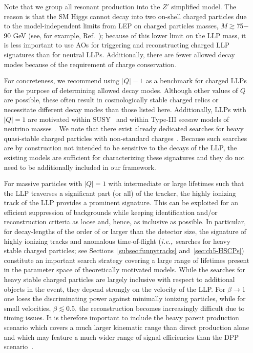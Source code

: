 Note that we group all resonant production into the $Z'$ simplified model.
The reason is that the SM Higgs cannot decay into two on-shell charged particles due to the model-independent limits from LEP on charged particles masses, $M\gtrsim$75$-$90 GeV (see, for example, Ref.~\cite{Abbiendi:2003yd}); because of this lower limit on the LLP mass, it is less important to use AOs for triggering and reconstructing charged LLP signatures than for neutral LLPs.
Additionally, there are fewer allowed decay modes because of the requirement of charge conservation. 

For concreteness, we recommend using $|Q|=1$ as a benchmark for charged LLPs for the purpose of determining allowed decay modes.
Although other values of $Q$ are possible, these often result in cosmologically stable charged relics or necessitate different decay modes than those listed here.
Additionally, LLPs with $|Q|=1$ are motivated within SUSY~\cite{Chen:1995yu,Thomas:1998wy,Feng:1999fu,Jittoh:2005pq,Brandenburg:2005he,Heisig:2013rya} and within Type-III seesaw models of neutrino masses~\cite{Bajc:2006ia,Bajc:2007zf,Franceschini:2008pz,Arhrib:2009mz}.
We note that there exist already dedicated searches for heavy quasi-stable charged particles with non-standard charges~\cite{Aad:2015kta,Khachatryan:2016sfv}.
Because such searches are by construction not intended to be sensitive to the decays of the LLP, the existing models are sufficient for characterizing these signatures and they do not need to be additionally included in our framework.

For massive particles with $|Q|=1$ with intermediate or large lifetimes such that the LLP traverses a significant part (or all) of the tracker, the highly ionizing track of the LLP provides a prominent signature.
This can be exploited for an efficient suppression of backgrounds while keeping identification and/or reconstruction criteria as loose and, hence, as inclusive as possible.
In particular, for decay-lengths of the order of or larger than the detector size, the signature of highly ionizing tracks and anomalous time-of-flight (\emph{i.e.,}~searches for heavy stable charged particles; see Sections~\ref{subsec:funnytracks} and~\ref{sec:ch5-HSCPs}) constitute an important search strategy covering a large range of lifetimes present in the parameter space of theoretically motivated models.
While the searches for heavy stable charged particles are largely inclusive with respect to additional objects in the event, they depend strongly on the velocity of the LLP\@.
For $\beta\to1$ one loses the discriminating power against minimally ionizing particles, while for small velocities, $\beta\lesssim0.5$, the reconstruction becomes increasingly difficult due to timing issues.
It is therefore important to include the heavy parent production scenario which covers a much larger kinematic range than direct production alone and which may feature a much wider range of signal efficiencies than the DPP scenario~\cite{Heisig:2015yla}.


